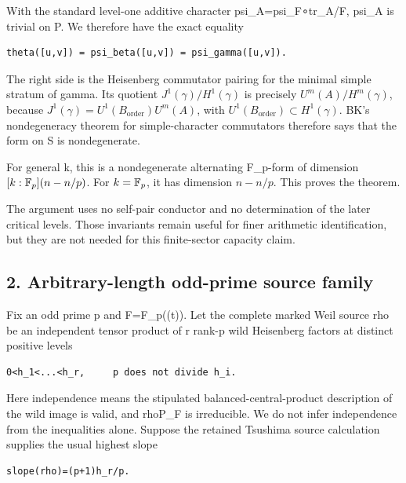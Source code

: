With the standard level-one additive character psi\_A=psi\_F∘tr\_A/F,
psi\_A is trivial on P. We therefore have the exact equality

\begin{Verbatim}[fontsize=\small,breaklines=true,breakanywhere=true]
theta([u,v]) = psi_beta([u,v]) = psi_gamma([u,v]).
\end{Verbatim}

The right side is the Heisenberg commutator pairing for the minimal
simple stratum of gamma. Its quotient
\(J^1(\gamma)/H^1(\gamma)\) is precisely
\(U^m(A)/H^m(\gamma)\), because
\(J^1(\gamma)=U^1(B_{\mathrm{order}})U^m(A)\), with
\(U^1(B_{\mathrm{order}})\subset H^1(\gamma)\). BK's nondegeneracy theorem for
simple-character commutators therefore says that the form on S is
nondegenerate.

For general k, this is a nondegenerate alternating F\_p-form of
dimension \([k:\mathbb F_p](n-n/p)\). For \(k=\mathbb F_p\), it has dimension \(n-n/p\). This
proves the theorem.

The argument uses no self-pair conductor and no determination of the
later critical levels. Those invariants remain useful for finer
arithmetic identification, but they are not needed for this
finite-sector capacity claim.

\hypertarget{odd_capacity-arbitrary-length-odd-prime-source-family}{%
\subsection{2. Arbitrary-length odd-prime source
family}\label{odd_capacity-arbitrary-length-odd-prime-source-family}}

Fix an odd prime p and F=F\_p((t)). Let the complete marked Weil source
rho be an independent tensor product of r rank-p wild Heisenberg factors
at distinct positive levels

\begin{Verbatim}[fontsize=\small,breaklines=true,breakanywhere=true]
0<h_1<...<h_r,     p does not divide h_i.
\end{Verbatim}

Here independence means the stipulated balanced-central-product
description of the wild image is valid, and rho\textbar P\_F is
irreducible. We do not infer independence from the inequalities alone.
Suppose the retained Tsushima source calculation supplies the usual
highest slope

\begin{Verbatim}[fontsize=\small,breaklines=true,breakanywhere=true]
slope(rho)=(p+1)h_r/p.
\end{Verbatim}

